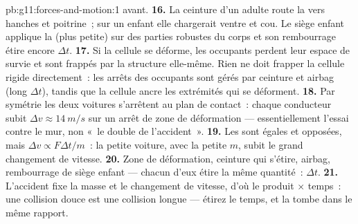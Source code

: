 \begin{solution}{pb:g11:forces-and-motion:1}
avant.
\textbf{16.} La ceinture d'un adulte route la
 vers hanches et poitrine~; sur un
enfant elle chargerait ventre et cou. Le siège enfant applique la
(plus petite)  sur des parties
robustes du corps et son rembourrage étire encore $\Delta t$.
\textbf{17.} Si la cellule se déforme, les occupants perdent leur
espace de survie et sont frappés par la structure elle-même. Rien ne
doit frapper la cellule rigide directement~: les arrêts des occupants
sont gérés par ceinture et airbag (long $\Delta t$), tandis que la
cellule ancre les extrémités qui se déforment.
\textbf{18.} Par symétrie les deux voitures s'arrêtent au plan de
contact~: chaque conducteur subit $\Delta v \approx \qty{14}{m/s}$ sur
un arrêt de zone de déformation --- essentiellement l'essai contre le
mur, non «~le double de l'accident~».
\textbf{19.} Les  sont égales et
opposées, mais $\Delta v \propto F\Delta t/m$~: la petite voiture, avec
la petite $m$, subit le grand changement de vitesse.
\textbf{20.} Zone de déformation, ceinture qui s'étire, airbag,
rembourrage de siège enfant --- chacun d'eux étire la même quantité~:
$\Delta t$.
\textbf{21.} L'accident fixe la masse et le changement de vitesse,
d'où le produit  $\times$ temps~: une
collision douce est une collision longue --- étirez le temps, et la
 tombe dans le même rapport.
\end{solution}
